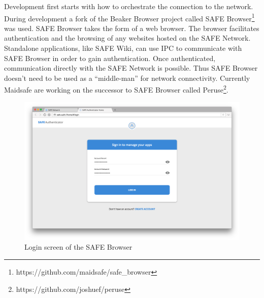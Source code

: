Development first starts with how to orchestrate the connection to the network. During development a fork of the Beaker Browser project called SAFE Browser\footnote{https://github.com/maidsafe/safe\_browser} was used. SAFE Browser takes the form of a web browser. The browser facilitates authentication and the browsing of any websites hosted on the SAFE Network. Standalone applications, like SAFE Wiki, can use IPC to communicate with SAFE Browser in order to gain authentication. Once authenticated, communication directly with the SAFE Network is possible. Thus SAFE Browser doesn't need to be used as a ``middle-man'' for network connectivity. Currently Maidsafe are working on the successor to SAFE Browser called Peruse\footnote{https://github.com/joshuef/peruse}. 

\begin{figure}[h]
	\begin{center}
		\includegraphics[width=\textwidth]{images/safe-browser-login}
		\caption{Login screen of the SAFE Browser}
		\label{fig:safe-browser-login}
	\end{center}
\end{figure}

